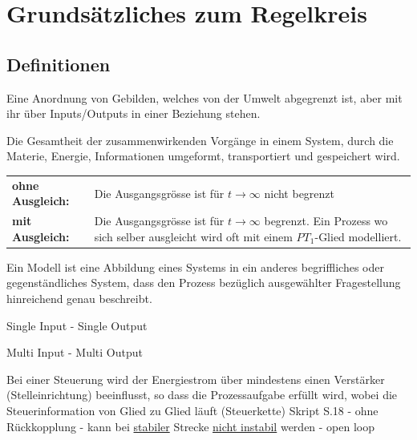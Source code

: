 \section{Grundsätzliches zum Regelkreis}
\subsection{Definitionen }


\begin{description}[leftmargin=2.5cm]
 \item[System]	Eine Anordnung von Gebilden, welches von der Umwelt abgegrenzt ist, aber
								mit ihr über Inputs/Outputs in einer Beziehung stehen.
 \item[Prozess] Die Gesamtheit der zusammenwirkenden Vorgänge in einem System,
        		durch die Materie, Energie, Informationen umgeformt, transportiert und
        		gespeichert wird. \\
        		\begin{tabular}{lp{12cm}}
        		\textbf{ohne Ausgleich:} & Die Ausgangsgrösse ist für $t \rightarrow \infty$ nicht begrenzt \\
        		\textbf{mit Ausgleich:} & Die Ausgangsgrösse ist für $t \rightarrow \infty$ begrenzt. Ein Prozess wo sich selber ausgleicht wird oft mit einem $PT_1$-Glied modelliert.
        		\end{tabular}
 \item[Modell]	Ein Modell ist eine Abbildung eines Systems in ein anderes begriffliches oder
								gegenständliches System, dass den Prozess bezüglich ausgewählter Fragestellung
								hinreichend genau beschreibt.
 \item[SISO] Single Input - Single Output
 \item[MIMO] Multi Input - Multi Output
 \item[Steuerung]	Bei einer Steuerung wird der Energiestrom über mindestens einen Verstärker (Stelleinrichtung)
									beeinflusst, so dass die Prozessaufgabe erfüllt wird, wobei die Steuerinformation
									von Glied zu Glied läuft (Steuerkette) {\color{red} Skript S.18} \newline
									- ohne Rückkopplung \newline
									- kann bei \underline{stabiler} Strecke \underline{nicht instabil} werden \newline
									- open loop\\

\end{description}
